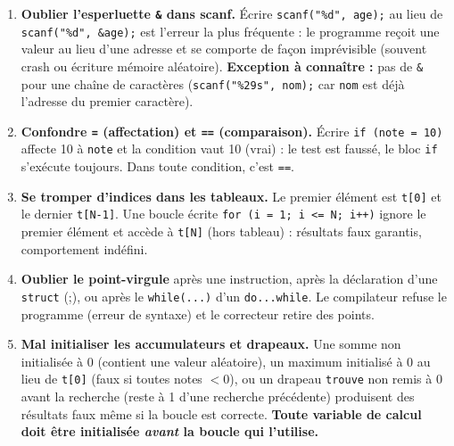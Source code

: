 \documentclass[11pt]{article}
\begin{document}
\begin{attention}
\begin{enumerate}
\item \textbf{Oublier l'esperluette \texttt{\&} dans scanf.} Écrire \texttt{scanf("\%d", age);} au lieu de \texttt{scanf("\%d", \&age);} est l'erreur la plus fréquente : le programme reçoit une valeur au lieu d'une adresse et se comporte de façon imprévisible (souvent crash ou écriture mémoire aléatoire). \textbf{Exception à connaître :} pas de \texttt{\&} pour une chaîne de caractères (\texttt{scanf("\%29s", nom);} car \texttt{nom} est déjà l'adresse du premier caractère).
\item \textbf{Confondre \texttt{=} (affectation) et \texttt{==} (comparaison).} Écrire \texttt{if (note = 10)} affecte 10 à \texttt{note} et la condition vaut 10 (vrai) : le test est faussé, le bloc \texttt{if} s'exécute toujours. Dans toute condition, c'est \texttt{==}.
\item \textbf{Se tromper d'indices dans les tableaux.} Le premier élément est \texttt{t[0]} et le dernier \texttt{t[N-1]}. Une boucle écrite \texttt{for (i = 1; i <= N; i++)} ignore le premier élément et accède à \texttt{t[N]} (hors tableau) : résultats faux garantis, comportement indéfini.
\item \textbf{Oublier le point-virgule} après une instruction, après la déclaration d'une \texttt{struct} (\texttt{};), ou après le \texttt{while(...)} d'un \texttt{do...while}. Le compilateur refuse le programme (erreur de syntaxe) et le correcteur retire des points.
\item \textbf{Mal initialiser les accumulateurs et drapeaux.} Une somme non initialisée à 0 (contient une valeur aléatoire), un maximum initialisé à 0 au lieu de \texttt{t[0]} (faux si toutes notes $< 0$), ou un drapeau \texttt{trouve} non remis à 0 avant la recherche (reste à 1 d'une recherche précédente) produisent des résultats faux même si la boucle est correcte. \textbf{Toute variable de calcul doit être initialisée \emph{avant} la boucle qui l'utilise.}
\end{enumerate}
\end{attention}
\end{document}
